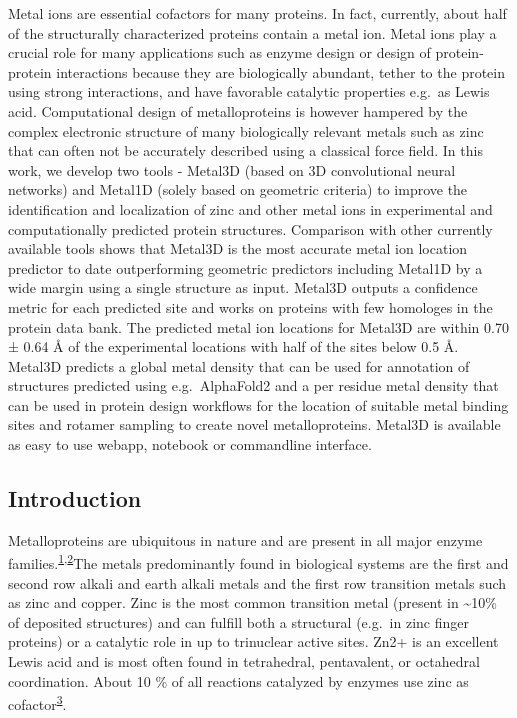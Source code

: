 \documentclass[  ASAPversion,
  ,
  9pt]{elife}
\begin{document}
Metal ions are essential cofactors for many proteins. In fact, currently, about half of the structurally characterized proteins contain a metal ion. Metal ions play a crucial role for many applications such as enzyme design or design of protein-protein interactions because they are biologically abundant, tether to the protein using strong interactions, and have favorable catalytic properties e.g.~as Lewis acid. Computational design of metalloproteins is however hampered by the complex electronic structure of many biologically relevant metals such as zinc that can often not be accurately described using a classical force field. In this work, we develop two tools - Metal3D (based on 3D convolutional neural networks) and Metal1D (solely based on geometric criteria) to improve the identification and localization of zinc and other metal ions in experimental and computationally predicted protein structures. Comparison with other currently available tools shows that Metal3D is the most accurate metal ion location predictor to date outperforming geometric predictors including Metal1D by a wide margin using a single structure as input. Metal3D outputs a confidence metric for each predicted site and works on proteins with few homologes in the protein data bank. The predicted metal ion locations for Metal3D are within 0.70 ± 0.64 Å of the experimental locations with half of the sites below 0.5 Å. Metal3D predicts a global metal density that can be used for annotation of structures predicted using e.g.~AlphaFold2 and a per residue metal density that can be used in protein design workflows for the location of suitable metal binding sites and rotamer sampling to create novel metalloproteins. Metal3D is available as easy to use webapp, notebook or commandline interface.

\hypertarget{introduction}{%
\subsection{Introduction}\label{introduction}}

Metalloproteins are ubiquitous in nature and are present in all major enzyme families.\textsuperscript{\protect\hyperlink{ref-gxiv5uTU}{1},\protect\hyperlink{ref-LY9UGI7}{2}}The metals predominantly found in biological systems are the first and second row alkali and earth alkali metals and the first row transition metals such as zinc and copper. Zinc is the most common transition metal (present in \textasciitilde10\% of deposited structures) and can fulfill both a structural (e.g.~in zinc finger proteins) or a catalytic role in up to trinuclear active sites. Zn2+ is an excellent Lewis acid and is most often found in tetrahedral, pentavalent, or octahedral coordination. About 10 \% of all reactions catalyzed by enzymes use zinc as cofactor\textsuperscript{\protect\hyperlink{ref-iqbHG3rv}{3}}.
\end{document}
